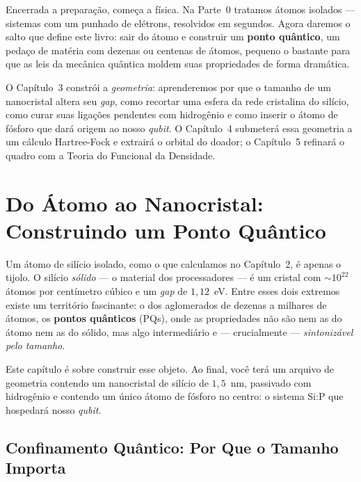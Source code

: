 \documentclass[11pt,a4paper,openany]{book}
\newcommand{\qubit}{\emph{qubit}}
\begin{document}
\noindent
Encerrada a preparação, começa a física. Na Parte~0 tratamos átomos isolados ---
sistemas com um punhado de elétrons, resolvidos em segundos. Agora daremos o
salto que define este livro: sair do átomo e construir um \textbf{ponto quântico},
um pedaço de matéria com dezenas ou centenas de átomos, pequeno o bastante para
que as leis da mecânica quântica moldem suas propriedades de forma dramática.

\vspace{0.3cm}
\noindent
O Capítulo~3 constrói a \emph{geometria}: aprenderemos por que o tamanho de um
nanocristal altera seu \emph{gap}, como recortar uma esfera da rede cristalina do
silício, como curar suas ligações pendentes com hidrogênio e como inserir o átomo
de fósforo que dará origem ao nosso \qubit{}. O Capítulo~4 submeterá essa
geometria a um cálculo Hartree-Fock e extrairá o orbital do doador; o Capítulo~5
refinará o quadro com a Teoria do Funcional da Densidade.

\chapter{Do Átomo ao Nanocristal: Construindo um Ponto Quântico}
\label{cap:nanocristal}

Um átomo de silício isolado, como o que calculamos no Capítulo~2, é apenas o
tijolo. O silício \emph{sólido} --- o material dos processadores --- é um cristal
com $\sim 10^{22}$ átomos por centímetro cúbico e um \emph{gap} de $1{,}12$~eV. Entre
esses dois extremos existe um território fascinante: o dos aglomerados de dezenas
a milhares de átomos, os \textbf{pontos quânticos} (PQs), onde as propriedades não
são nem as do átomo nem as do sólido, mas algo intermediário e --- crucialmente
--- \emph{sintonizável pelo tamanho}.

Este capítulo é sobre construir esse objeto. Ao final, você terá um arquivo de
geometria contendo um nanocristal de silício de $1{,}5$~nm, passivado com
hidrogênio e contendo um único átomo de fósforo no centro: o sistema Si:P que
hospedará nosso \qubit{}.

\section{Confinamento Quântico: Por Que o Tamanho Importa}
\label{sec:confinamento}
\end{document}
